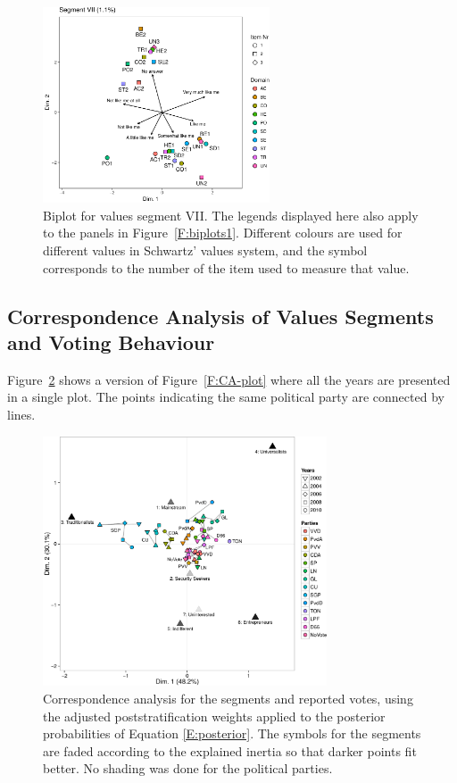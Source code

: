 \documentclass[12pt,letter]{article}\usepackage[]{graphicx}\usepackage[]{xcolor}
\begin{document}
\begin{figure}
\begin{center}
  \includegraphics[width=0.6\textwidth]{figures/Paper-biplots-7-edit2} 
\end{center}
\caption{Biplot for values segment VII. The legends displayed here also apply to the panels in Figure~\ref{F:biplots1}. Different colours are used for different values in Schwartz' values system, and the symbol corresponds to the number of the item used to measure that value.}\label{F:biplots2}
\end{figure}

\subsection*{Correspondence Analysis of Values Segments and Voting Behaviour}

Figure~\ref{F:CA-plot-all-years} shows a version of Figure~\ref{F:CA-plot} where all the years are presented in a single plot. The points indicating the same political party are connected by lines.

\begin{figure}
\begin{center} 
  \includegraphics[width=0.75\textwidth]{figures/Paper-CA-plot-1-edit} 
\end{center}
\caption{Correspondence analysis for the segments and reported votes, using the adjusted poststratification weights applied to the posterior probabilities of Equation \eqref{E:posterior}. The symbols for the segments are faded according to the explained inertia so that darker points fit better. No shading was done for the political parties.}\label{F:CA-plot-all-years}
\end{figure}
\end{document}
